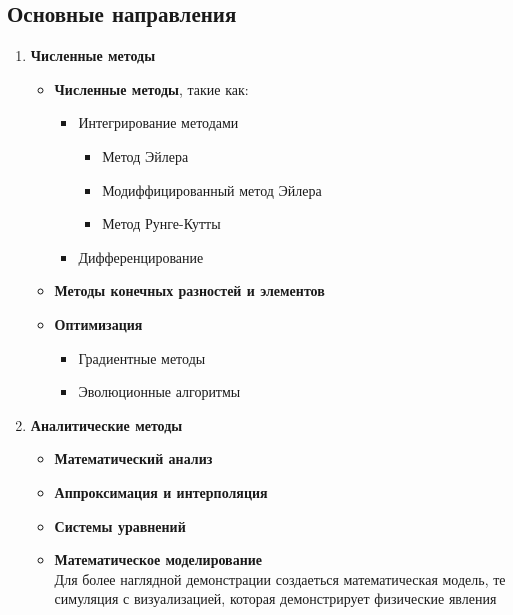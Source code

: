 \documentclass[a4paper,12pt]{article}
\begin{document}
\subsection{Основные направления}
\begin{enumerate}
    \item \textbf{Численные методы}\begin{itemize}
        \item \textbf{Численные методы}, такие как: \begin{itemize}%
            \item Интегрирование методами\begin{itemize}
                \item Метод Эйлера
                \item Модиффицированный метод Эйлера
                \item Метод Рунге-Кутты
            \end{itemize}
            \item Дифференцирование
        \end{itemize}
        \item \textbf{Методы конечных разностей и элементов}%
        \item \textbf{Оптимизация}\begin{itemize} %
            \item Градиентные методы
            \item Эволюционные алгоритмы
        \end{itemize}
    \end{itemize}
    \item \textbf{Аналитические методы}\begin{itemize}
        \item \textbf{Математический анализ}
        \item \textbf{Аппроксимация и интерполяция}
        \item \textbf{Системы уравнений}
        \item \textbf{Математическое моделирование}\\ Для более наглядной демонстрации создаеться математическая модель, те симуляция с визуализацией, которая демонстрирует физические явления
    \end{itemize}
\end{enumerate}
\end{document}
